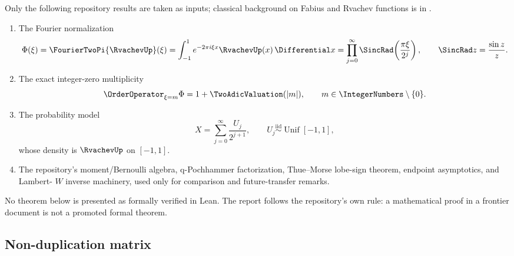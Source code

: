 \documentclass[11pt]{article}
\theoremstyle{definition}
\theoremstyle{remark}
\begin{document}
Only the following repository results are taken as inputs; classical background on Fabius and Rvachev functions is in \cite{Fabius1966,Rvachev1990,Arias2017,Arias2018}.
\begin{enumerate}[leftmargin=2em]
  \item The Fourier normalization
  \begin{equation}\label{eq:Phi-definition}
    \Phi(\xi)=\FourierTwoPi{\RvachevUp}(\xi)
      =\int_{-1}^{1}e^{-2\pi i\xi x}\RvachevUp(x)\,\Differential x
      =\prod_{j=0}^{\infty}\SincRad\!\left(\frac{\pi\xi}{2^j}\right),
      \qquad \SincRad z=\frac{\sin z}{z}.
  \end{equation}
  \item The exact integer-zero multiplicity
  \begin{equation}\label{eq:repo-multiplicity}
    \OrderOperator_{\xi=m}\Phi=1+\TwoAdicValuation(|m|),\qquad m\in\IntegerNumbers\setminus\{0\}.
  \end{equation}
  \item The probability model
  \begin{equation}\label{eq:random-X}
    X=\sum_{j=0}^{\infty}\frac{U_j}{2^{j+1}},
    \qquad U_j\stackrel{\mathrm{iid}}{\sim}\operatorname{Unif}[-1,1],
  \end{equation}
  whose density is \(\RvachevUp\) on \([-1,1]\).
  \item The repository's moment/Bernoulli algebra, q-Pochhammer factorization, Thue--Morse lobe-sign theorem, endpoint asymptotics, and Lambert-
  \(W\) inverse machinery, used only for comparison and future-transfer remarks.
\end{enumerate}
No theorem below is presented as formally verified in Lean.  The report follows the repository's own rule: a mathematical proof in a frontier document is not a promoted formal theorem.

\subsection{Non-duplication matrix}
\end{document}

